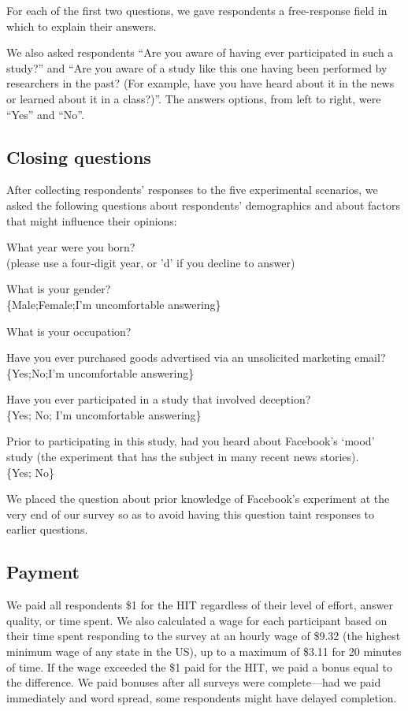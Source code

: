 For each of the first two questions, we gave respondents a free-response field in which to explain their answers.

We also asked respondents ``Are you aware of having ever participated in such a study?'' and ``Are you aware of a study like this one having been performed by researchers in the past? (For example, have you have heard about it in the news or learned about it in a class?)''.  The answers options, from left to right, were ``Yes'' and ``No''.

\subsection{Closing questions}
After collecting respondents' responses to the five experimental scenarios, we asked the following questions about respondents' demographics and about factors that might influence their opinions:
%
\begin{packed_itemize}
\footnotesize
\item What year were you born?\\ (please use a four-digit year, or 'd' if you decline to answer)
\item
What is your gender?
\\  \{Male;Female;I'm uncomfortable answering\}
\item
What is your occupation?
\item
Have you ever purchased goods advertised via an unsolicited marketing email?
\\ \{Yes;No;I'm uncomfortable answering\}
\item
Have you ever participated in a study that involved deception?
\\ \{Yes; No; I'm uncomfortable answering\}
\item
Prior to participating in this study, had you heard about Facebook's `mood' study (the experiment that has the subject in many recent news stories).
\\ \{Yes; No\}
\end{packed_itemize}
%
We placed the question about prior knowledge of Facebook's experiment at the very end of our survey so as to avoid having this question taint responses to earlier questions.

\subsection{Payment}
We paid all respondents \$1 for the HIT regardless of their level of effort, answer quality, or time spent.  We also calculated a wage for each participant based on their time spent responding to the survey at an hourly wage of \$9.32 (the highest minimum wage of any state in the US), up to a maximum of \$3.11 for 20 minutes of time.  If the wage exceeded the \$1 paid for the HIT, we paid a bonus equal to the difference.  We paid bonuses after all surveys were complete---had we paid immediately and word spread, some respondents might have delayed completion.



